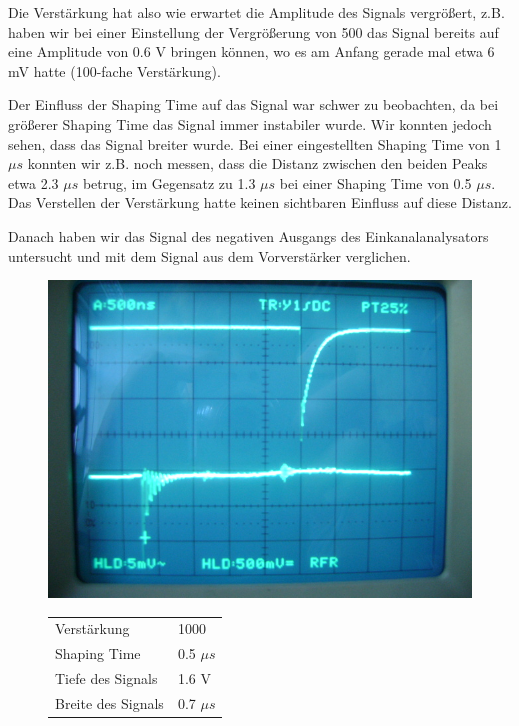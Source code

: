 Die Verstärkung hat also wie erwartet die Amplitude des Signals vergrößert, z.B. haben wir bei einer Einstellung der Vergrößerung von 500 das Signal bereits auf eine Amplitude von 0.6 V bringen können, wo es am Anfang gerade mal etwa 6 mV hatte (100-fache Verstärkung). 

Der Einfluss der Shaping Time auf das Signal war schwer zu beobachten, da bei größerer Shaping Time das Signal immer instabiler wurde. Wir konnten jedoch sehen, dass das Signal breiter wurde. Bei einer eingestellten Shaping Time von 1 $\mu s$ konnten wir z.B. noch messen, dass die Distanz zwischen den beiden Peaks etwa 2.3 $\mu s$ betrug, im Gegensatz zu 1.3 $\mu s$ bei einer Shaping Time von 0.5 $\mu s$. Das Verstellen der Verstärkung hatte keinen sichtbaren Einfluss auf diese Distanz.

Danach haben wir das Signal des negativen Ausgangs des Einkanalanalysators untersucht und mit dem Signal aus dem Vorverstärker verglichen.

\begin{figure}[H]
\begin{minipage}{0.4\textwidth}
\centering \includegraphics[width = \textwidth]{messergebnisse/5.JPG}
\end{minipage}
\begin{minipage}{0.6\textwidth}
\centering \begin{tabular}{l l}
Verstärkung & 1000\\
Shaping Time & 0.5 $\mu s$\\
Tiefe des Signals & 1.6 V\\
Breite des Signals & 0.7 $\mu s$
\end{tabular}
\end{minipage}
\end{figure}

